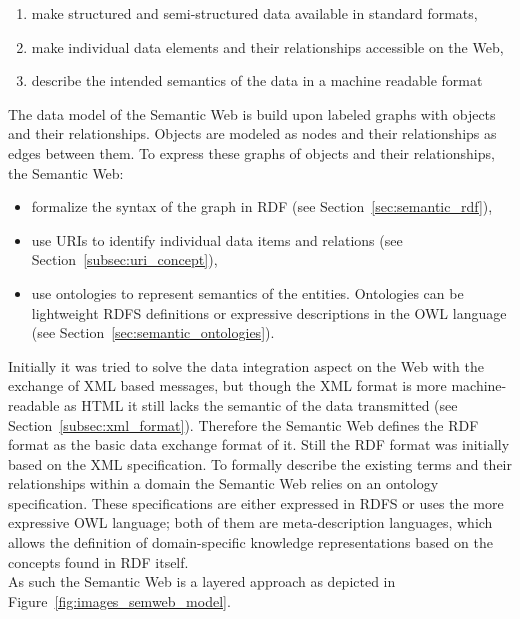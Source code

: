 \begin{enumerate}
	\item make structured and semi-structured data available in standard formats,
	\item make individual data elements and their relationships accessible on the Web,
	\item describe the intended semantics of the data in a machine readable format
\end{enumerate}

The data model of the Semantic Web is build upon labeled graphs with objects and their relationships. Objects are modeled as nodes and their relationships as edges between them. To express these graphs of objects and their relationships, the Semantic Web: \@

\begin{itemize}
	\item formalize the syntax of the graph in \gls{RDF} (see Section~\ref{sec:semantic_rdf}),
	\item use \gls{URI}s to identify individual data items and relations (see Section~\ref{subsec:uri_concept}),
	\item use ontologies to represent semantics of the entities. Ontologies can be lightweight \gls{RDFS} definitions or expressive descriptions in the \gls{OWL} language (see Section~\ref{sec:semantic_ontologies}).
\end{itemize}

Initially it was tried to solve the data integration aspect on the Web with the exchange of \gls{XML} based messages, but though the \gls{XML} format is more machine-readable as \gls{HTML} it still lacks the semantic of the data transmitted (see Section~\ref{subsec:xml_format}). Therefore the Semantic Web defines the \gls{RDF} format as the basic data exchange format of it. Still the \gls{RDF} format was initially based on the \gls{XML} specification. To formally describe the existing terms and their relationships within a domain the Semantic Web relies on an ontology specification. These specifications are either expressed in \gls{RDFS} or uses the more expressive \gls{OWL} language; both of them are meta-description languages, which allows the definition of domain-specific knowledge representations based on the concepts found in \gls{RDF} itself. \\

As such the Semantic Web is a layered approach as depicted in Figure~\ref{fig:images_semweb_model}.\@

